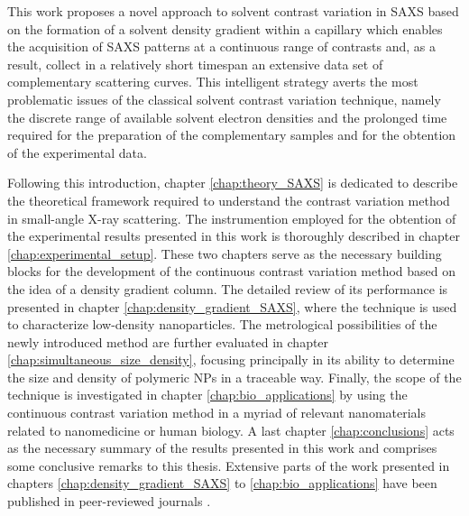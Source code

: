 This work proposes a novel approach to solvent contrast variation in SAXS based on the formation of a solvent density gradient within a capillary which enables the acquisition of SAXS patterns at a continuous range of contrasts and, as a result, collect in a relatively short timespan an extensive data set of complementary scattering curves. This intelligent strategy averts the most problematic issues of the classical solvent contrast variation technique, namely the discrete range of available solvent electron densities and the prolonged time required for the preparation of the complementary samples and for the obtention of the experimental data.

Following this introduction, chapter \ref{chap:theory_SAXS} is dedicated to describe the theoretical framework required to understand the contrast variation method in small-angle X-ray scattering. The instrumention employed for the obtention of the experimental results presented in this work is thoroughly described in chapter \ref{chap:experimental_setup}. These two chapters serve as the necessary building blocks for the development of the continuous contrast variation method based on the idea of a density gradient column. The detailed review of its performance is presented in chapter \ref{chap:density_gradient_SAXS}, where the technique is used to characterize low-density nanoparticles. The metrological possibilities of the newly introduced method are further evaluated in chapter \ref{chap:simultaneous_size_density}, focusing principally in its ability to determine the size and density of polymeric NPs in a traceable way. Finally, the scope of the technique is investigated in chapter \ref{chap:bio_applications} by using the continuous contrast variation method in a myriad of relevant nanomaterials related to nanomedicine or human biology. A last chapter \ref{chap:conclusions} acts as the necessary summary of the results presented in this work and comprises some conclusive remarks to this thesis. Extensive parts of the work presented in chapters \ref{chap:density_gradient_SAXS} to \ref{chap:bio_applications} have been published in peer-reviewed journals \citep{minelli_characterization_2014,garcia-diez_nanoparticle_2015,garcia-diez_size_2016,garcia-diez_simultaneous_2016}.




